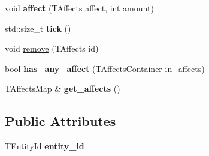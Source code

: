 \begin{DoxyCompactItemize}
\item 
\mbox{\label{structmods_1_1affects_1_1dissolver_afa1664b53140ef4ddf136e2ee1b12c3b}} 
void {\bfseries affect} (T\+Affects affect, int amount)
\item 
\mbox{\label{structmods_1_1affects_1_1dissolver_a26d75b016d86619cb74f80418f98bc10}} 
std\+::size\+\_\+t {\bfseries tick} ()
\item 
void \hyperlink{structmods_1_1affects_1_1dissolver_ad8059ffe681c083c83ec0fa82ef82a9b}{remove} (T\+Affects id)
\item 
\mbox{\label{structmods_1_1affects_1_1dissolver_a0114d6742feb5f288775024bf7ce35a3}} 
bool {\bfseries has\+\_\+any\+\_\+affect} (T\+Affects\+Container in\+\_\+affects)
\item 
\mbox{\label{structmods_1_1affects_1_1dissolver_a40c6cc4d89660af3813a24b596653b1e}} 
T\+Affects\+Map \& {\bfseries get\+\_\+affects} ()
\end{DoxyCompactItemize}
\subsection*{Public Attributes}
\begin{DoxyCompactItemize}
\item 
\mbox{\label{structmods_1_1affects_1_1dissolver_a4a91e5c14d71cd2c5a0b353f799f8e64}} 
T\+Entity\+Id {\bfseries entity\+\_\+id}
\end{DoxyCompactItemize}
